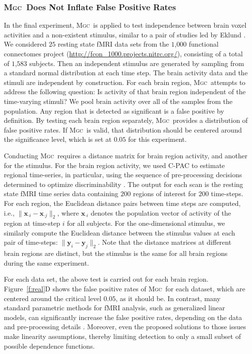 \documentclass[11pt]{article}
\providecommand{\sct}[1]{{\normalfont\textsc{#1}}}
\providecommand{\mb}[1]{\boldsymbol{#1}}
\newcommand{\Mgc}{\sct{Mgc}}
\begin{document}
\subsubsection*{\Mgc~Does Not Inflate False Positive Rates} 


In the final experiment, \Mgc~is applied to test independence between brain voxel activities and a non-existent stimulus, similar to a pair of studies led by Eklund  \cite{EklundKnutsson2012,Eklund2015}. We considered $25$ resting state fMRI data sets from the $1$,$000$ functional connectomes project (\url{http://fcon_1000.projects.nitrc.org/}), consisting of a total of $1$,$583$ subjects.
Then an independent stimulus are generated by sampling from a standard normal distribution at each time step. The brain activity data and the stimuli are independent by construction.
For each brain region, \Mgc~attempts to address the following question: Is activity of that  brain region independent of the time-varying stimuli? We pool brain activity over all of the samples from the population.
Any region that is detected as significant is a false positive by definition.  By testing each brain region separately, \Mgc~provides a distribution of false positive rates.  If \Mgc~is valid, that distribution should be centered around the significance level, which is set at $0.05$ for this experiment.

Conducting \Mgc~requires a distance matrix for brain region activity, and another for the stimulus. For the brain region activity, we used C-PAC to estimate regional time-series, in particular, using the sequence of pre-processing decisions determined to optimize discriminability \cite{Wang2016}.  The output for each scan is the resting state fMRI time series data containing $200$ regions of interest for $200$ time-steps.
For each region, the Euclidean distance pairs between time steps are computed, i.e., $\|\mb{x}_{\cdot i}-\mb{x}_{\cdot j}\|_2$,  where $\mb{x}_{\cdot i}$ denotes the population vector of activity of the region at time-step $i$ for all subjects.
For the one-dimensional stimulus, we similarly compute the Euclidean distance between the stimulus values at each pair of time-steps: $\|\mb{y}_i - \mb{y}_j\|_2$.
Note that the distance matrices at different brain regions are distinct, but the stimulus is the same for all brain regions during the same experiment.


For each data set, the above test is carried out for each brain region. 
Figure~\ref{f:real}{\color{magenta}D} shows the false positive rates of  \Mgc~for each dataset, which are centered around the critical level $0.05$, as it should be.
In contrast, many standard parametric methods for fMRI analysis, such as generalized linear models, can significantly increase the false positive rates, depending on the data and pre-processing details \cite{EklundKnutsson2012,Eklund2015}. Moreover, even the proposed solutions to those issues make linearity assumptions, thereby limiting detection to only a small subset of possible dependence functions.
\end{document}
